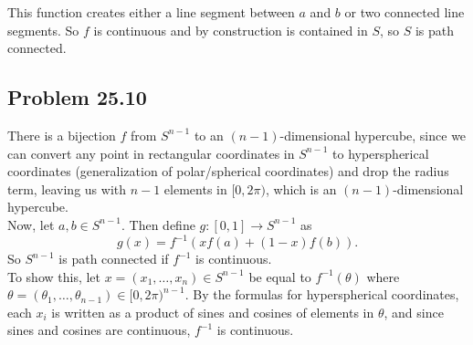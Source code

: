 \documentclass{article}
\begin{document}
This function creates either a line segment between $a$ and $b$ or two connected line segments. So $f$ is continuous and by construction is contained in $S$, so $S$ is path connected.

\subsection*{Problem 25.10}
There is a bijection $f$ from $S^{n - 1}$ to an $(n - 1)$-dimensional hypercube, since we can convert any point in rectangular coordinates in $S^{n - 1}$ to hyperspherical coordinates (generalization of polar/spherical coordinates) and drop the radius term, leaving us with $n - 1$ elements in $[0, 2\pi)$, which is an $(n - 1)$-dimensional hypercube. \\

Now, let $a, b \in S^{n - 1}$. Then define $g:[0, 1] \to S^{n - 1}$ as
$$g(x) = f^{-1}(xf(a) + (1 - x)f(b)).$$
So $S^{n - 1}$ is path connected if $f^{-1}$ is continuous. \\

To show this, let $x = (x_1, \ldots, x_n) \in S^{n - 1}$ be equal to $f^{-1}(\theta)$ where $\theta = (\theta_1, \ldots, \theta_{n - 1}) \in [0, 2\pi)^{n - 1}$. By the formulas for hyperspherical coordinates, each $x_i$ is written as a product of sines and cosines of elements in $\theta$, and since sines and cosines are continuous, $f^{-1}$ is continuous.
\end{document}
